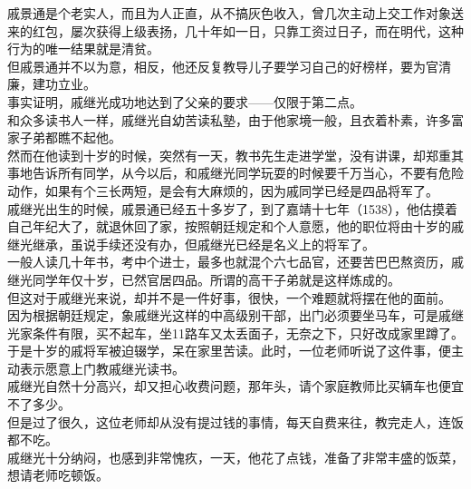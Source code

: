 \begin{multicols}{\theparacolNo}
戚景通是个老实人，而且为人正直，从不搞灰色收入，曾几次主动上交工作对象送来的红包，屡次获得上级表扬，几十年如一日，只靠工资过日子，而在明代，这种行为的唯一结果就是清贫。\\

但戚景通并不以为意，相反，他还反复教导儿子要学习自己的好榜样，要为官清廉，建功立业。\\

事实证明，戚继光成功地达到了父亲的要求——仅限于第二点。\\

和众多读书人一样，戚继光自幼苦读私塾，由于他家境一般，且衣着朴素，许多富家子弟都瞧不起他。\\

然而在他读到十岁的时候，突然有一天，教书先生走进学堂，没有讲课，却郑重其事地告诉所有同学，从今以后，和戚继光同学玩耍的时候要千万当心，不要有危险动作，如果有个三长两短，是会有大麻烦的，因为戚同学已经是四品将军了。\\

戚继光出生的时候，戚景通已经五十多岁了，到了嘉靖十七年（1538），他估摸着自己年纪大了，就退休回了家，按照朝廷规定和个人意愿，他的职位将由十岁的戚继光继承，虽说手续还没有办，但戚继光已经是名义上的将军了。\\

一般人读几十年书，考中个进士，最多也就混个六七品官，还要苦巴巴熬资历，戚继光同学年仅十岁，已然官居四品。所谓的高干子弟就是这样炼成的。\\

但这对于戚继光来说，却并不是一件好事，很快，一个难题就将摆在他的面前。\\

因为根据朝廷规定，象戚继光这样的中高级别干部，出门必须要坐马车，可是戚继光家条件有限，买不起车，坐11路车又太丢面子，无奈之下，只好改成家里蹲了。\\

于是十岁的戚将军被迫辍学，呆在家里苦读。此时，一位老师听说了这件事，便主动表示愿意上门教戚继光读书。\\

戚继光自然十分高兴，却又担心收费问题，那年头，请个家庭教师比买辆车也便宜不了多少。\\

但是过了很久，这位老师却从没有提过钱的事情，每天自费来往，教完走人，连饭都不吃。\\

戚继光十分纳闷，也感到非常愧疚，一天，他花了点钱，准备了非常丰盛的饭菜，想请老师吃顿饭。\\


\end{multicols}
